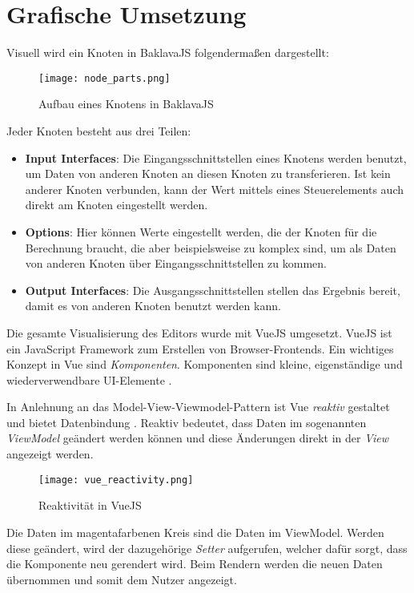 \section{Grafische Umsetzung}
\label{sec:baklava:ui}

Visuell wird ein Knoten in BaklavaJS folgendermaßen dargestellt:

\begin{figure}[H]
    \centering
    \texttt{[image: node\_parts.png]}
    \caption{Aufbau eines Knotens in BaklavaJS}
    \label{fig:nodeparts}
\end{figure}

Jeder Knoten besteht aus drei Teilen:
\begin{itemize}
    \item \textbf{Input Interfaces}: Die Eingangsschnittstellen eines Knotens werden benutzt, um Daten von anderen Knoten an diesen Knoten zu transferieren. Ist kein anderer Knoten verbunden, kann der Wert mittels eines Steuerelements auch direkt am Knoten eingestellt werden.
    \item \textbf{Options}: Hier können Werte eingestellt werden, die der Knoten für die Berechnung braucht, die aber beispielsweise zu komplex sind, um als Daten von anderen Knoten über Eingangsschnittstellen zu kommen.
    \item \textbf{Output Interfaces}: Die Ausgangsschnittstellen stellen das Ergebnis bereit, damit es von anderen Knoten benutzt werden kann.
\end{itemize}

Die gesamte Visualisierung des Editors wurde mit VueJS umgesetzt. VueJS ist ein JavaScript Framework zum Erstellen von Browser-Frontends. Ein wichtiges Konzept in Vue sind \textit{Komponenten}. Komponenten sind kleine, eigenständige und wiederverwendbare UI-Elemente \cite{vue:components}.

In Anlehnung an das Model-View-Viewmodel-Pattern ist Vue \textit{reaktiv} gestaltet und bietet Datenbindung \cite{vue:instance}. Reaktiv bedeutet, dass Daten im sogenannten \textit{ViewModel} geändert werden können und diese Änderungen direkt in der \textit{View} angezeigt werden.

\begin{figure}[H]
    \centering
    \texttt{[image: vue\_reactivity.png]}
    \caption{Reaktivität in VueJS \cite{vue:reactivity}}
    \label{fig:vuereactivity}
\end{figure}

Die Daten im magentafarbenen Kreis sind die Daten im ViewModel. Werden diese geändert, wird der dazugehörige \textit{Setter} aufgerufen, welcher dafür sorgt, dass die Komponente neu gerendert wird. Beim Rendern werden die neuen Daten übernommen und somit dem Nutzer angezeigt.

